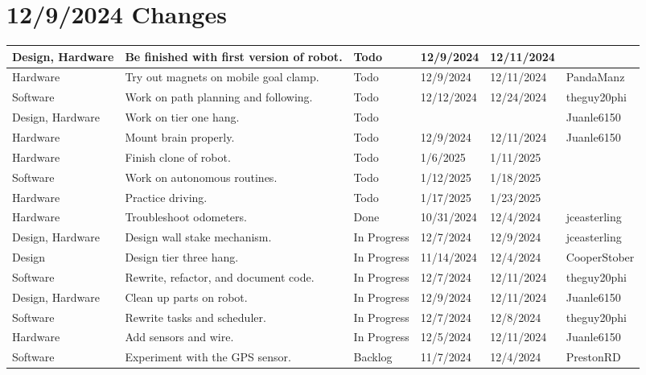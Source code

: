 \section{12/9/2024 Changes}
\begin{center}
\begin{longtable}{| p{40pt} | p{150pt} | p{35pt} | p{33pt} | p{33pt} | p{40pt} |}
\hline \rowcolor{IndianRed1}
Design, Hardware & Be finished with first version of robot. & Todo & 12/9/2024 & 12/11/2024 & \\
\hline \rowcolor{IndianRed1}
Hardware & Try out magnets on mobile goal clamp. & Todo & 12/9/2024 & 12/11/2024 & PandaManz \\
\hline \rowcolor{IndianRed1}
Software & Work on path planning and following. & Todo & 12/12/2024 & 12/24/2024 & theguy20phi \\
\hline \rowcolor{IndianRed1}
Design, Hardware & Work on tier one hang. & Todo &  &  & Juanle6150 \\
\hline \rowcolor{IndianRed1}
Hardware & Mount brain properly. & Todo & 12/9/2024 & 12/11/2024 & Juanle6150 \\
\hline \rowcolor{IndianRed1}
Hardware & Finish clone of robot. & Todo & 1/6/2025 & 1/11/2025 & \\
\hline \rowcolor{IndianRed1}
Software & Work on autonomous routines. & Todo & 1/12/2025 & 1/18/2025 & \\
\hline \rowcolor{IndianRed1}
Hardware & Practice driving. & Todo & 1/17/2025 & 1/23/2025 & \\
\hline \rowcolor{DarkSeaGreen1}
Hardware & Troubleshoot odometers. & Done & 10/31/2024 & 12/4/2024 & jceasterling \\
\hline \rowcolor{LightGoldenrod1}
Design, Hardware & Design wall stake mechanism. & In Progress & 12/7/2024 & 12/9/2024 & jceasterling \\
\hline \rowcolor{LightGoldenrod1}
Design & Design tier three hang. & In Progress & 11/14/2024 & 12/4/2024 & CooperStober \\
\hline \rowcolor{LightGoldenrod1}
Software & Rewrite, refactor, and document code. & In Progress & 12/7/2024 & 12/11/2024 & theguy20phi \\
\hline \rowcolor{LightGoldenrod1}
Design, Hardware & Clean up parts on robot. & In Progress & 12/9/2024 & 12/11/2024 & Juanle6150 \\
\hline \rowcolor{LightGoldenrod1}
Software & Rewrite tasks and scheduler. & In Progress & 12/7/2024 & 12/8/2024 & theguy20phi \\
\hline \rowcolor{LightGoldenrod1}
Hardware & Add sensors and wire. & In Progress & 12/5/2024 & 12/11/2024 & Juanle6150 \\
\hline \rowcolor{Ivory2}
Software & Experiment with the GPS sensor. & Backlog & 11/7/2024 & 12/4/2024 & PrestonRD \\
\hline
\end{longtable}
\end{center}


